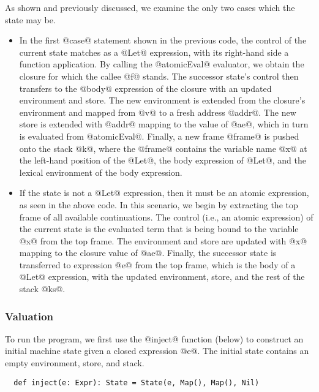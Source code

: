 \documentclass[acmsmall, review]{acmart}\settopmatter{}
\begin{document}
As shown and previously discussed, we examine the only two cases which the state may be.

\begin{itemize}

\item In the first @case@ statement shown in the previous code, the control of the current 
  state matches as a @Let@ expression, with its right-hand side a function application.
  By calling the @atomicEval@ evaluator, we obtain the closure for which the callee @f@ stands.
  The successor state's control then transfers to the @body@ expression of the closure with 
  an updated environment and store. The new environment is extended from the closure's 
  environment and mapped from @v@ to a fresh address @addr@. The new store is extended with
  @addr@ mapping to the value of @ae@, which in turn is evaluated from @atomicEval@.
  Finally, a new frame @frame@ is pushed onto the stack @k@, where the @frame@ contains 
  the variable name @x@ at the left-hand position of the @Let@, the body expression of 
  @Let@, and the lexical environment of the body expression.

\item If the state is not a @Let@ expression, then it must be an atomic expression, as seen
  in the above code. In this scenario, we begin by extracting the top frame of all available
  continuations. The control (i.e., an atomic expression) of the current state is the 
  evaluated term that is being bound to the variable @x@ from the top frame.
  The environment and store are updated with @x@ mapping to the closure value of @ae@.
  Finally, the successor state is transferred to expression @e@ from the top frame,
  which is the body of a @Let@ expression, with the updated environment, store, and
  the rest of the stack @ks@.

\end{itemize}

\subsubsection{Valuation}

To run the program, we first use the @inject@ function (below) to construct an initial 
machine state given a closed expression @e@. The initial state contains an empty environment,
store, and stack.
\begin{lstlisting}
  def inject(e: Expr): State = State(e, Map(), Map(), Nil)
\end{lstlisting}
\end{document}
